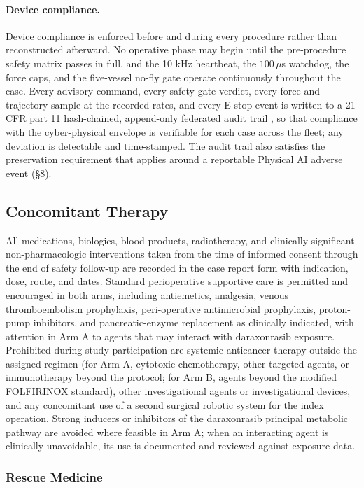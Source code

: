 \paragraph{Device compliance.}
Device compliance is enforced before and during every procedure rather than
reconstructed afterward. No operative phase may begin until the pre-procedure safety
matrix passes in full, and the 10 kHz heartbeat, the $100\,\mu$s watchdog, the force
caps, and the five-vessel no-fly gate operate continuously throughout the case. Every
advisory command, every safety-gate verdict, every force and trajectory sample at the
recorded rates, and every E-stop event is written to a 21 CFR part 11 hash-chained,
append-only federated audit trail \cite{ecfr2026part11}, so that compliance with the
cyber-physical envelope is verifiable for each case across the fleet; any deviation is
detectable and time-stamped. The audit trail also satisfies the preservation
requirement that applies around a reportable Physical AI adverse event (\S8).

\subsection{Concomitant Therapy}

All medications, biologics, blood products, radiotherapy, and clinically significant
non-pharmacologic interventions taken from the time of informed consent through the
end of safety follow-up are recorded in the case report form with indication, dose,
route, and dates. Standard perioperative supportive care is permitted and encouraged
in both arms, including antiemetics, analgesia, venous thromboembolism prophylaxis,
peri-operative antimicrobial prophylaxis, proton-pump inhibitors, and
pancreatic-enzyme replacement as clinically indicated, with attention in Arm A to
agents that may interact with daraxonrasib exposure. Prohibited during study
participation are systemic anticancer therapy outside the assigned regimen (for
Arm A, cytotoxic chemotherapy, other targeted agents, or immunotherapy beyond the
protocol; for Arm B, agents beyond the modified FOLFIRINOX standard), other
investigational agents or investigational devices, and any concomitant use of a
second surgical robotic system for the index operation. Strong inducers or inhibitors
of the daraxonrasib principal metabolic pathway are avoided where feasible in Arm A;
when an interacting agent is clinically unavoidable, its use is documented and
reviewed against exposure data.

\subsubsection{Rescue Medicine}

